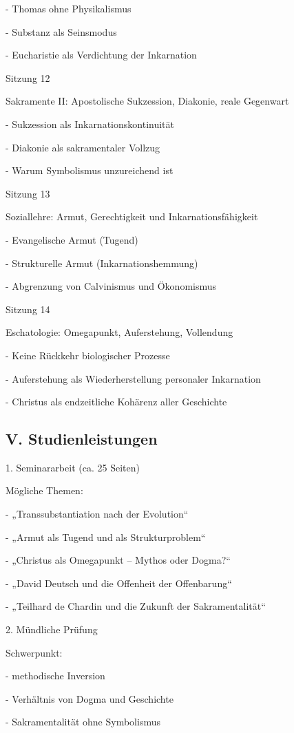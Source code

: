 \documentclass[
  ngerman,
]{article}
\begin{document}
- Thomas ohne Physikalismus

- Substanz als Seinsmodus

- Eucharistie als Verdichtung der Inkarnation

Sitzung 12

Sakramente II: Apostolische Sukzession, Diakonie, reale Gegenwart

- Sukzession als Inkarnationskontinuität

- Diakonie als sakramentaler Vollzug

- Warum Symbolismus unzureichend ist

Sitzung 13

Soziallehre: Armut, Gerechtigkeit und Inkarnationsfähigkeit

- Evangelische Armut (Tugend)

- Strukturelle Armut (Inkarnationshemmung)

- Abgrenzung von Calvinismus und Ökonomismus

Sitzung 14

Eschatologie: Omegapunkt, Auferstehung, Vollendung

- Keine Rückkehr biologischer Prozesse

- Auferstehung als Wiederherstellung personaler Inkarnation

- Christus als endzeitliche Kohärenz aller Geschichte

\subsection{V. Studienleistungen}\label{v.-studienleistungen}

1. Seminararbeit (ca. 25 Seiten)

Mögliche Themen:

- „Transsubstantiation nach der Evolution``

- „Armut als Tugend und als Strukturproblem``

- „Christus als Omegapunkt -- Mythos oder Dogma?{\kern0pt}``

- „David Deutsch und die Offenheit der Offenbarung``

- „Teilhard de Chardin und die Zukunft der Sakramentalität``

2. Mündliche Prüfung

Schwerpunkt:

- methodische Inversion

- Verhältnis von Dogma und Geschichte

- Sakramentalität ohne Symbolismus
\end{document}
